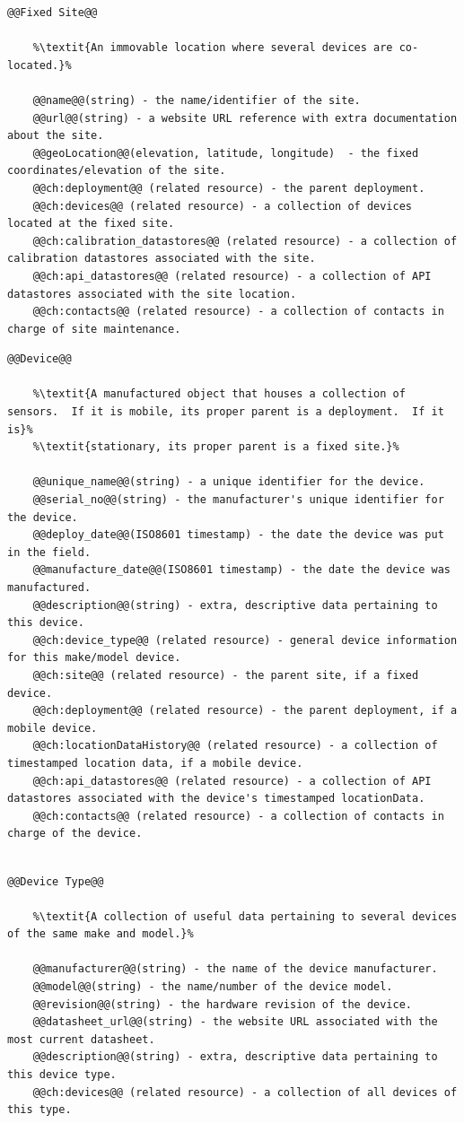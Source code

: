 \begin{lstlisting}[style=codedef]
@@Fixed Site@@
	
	%\textit{An immovable location where several devices are co-located.}%

	@@name@@(string) - the name/identifier of the site.
	@@url@@(string) - a website URL reference with extra documentation about the site.
	@@geoLocation@@(elevation, latitude, longitude)  - the fixed coordinates/elevation of the site.
	@@ch:deployment@@ (related resource) - the parent deployment.
	@@ch:devices@@ (related resource) - a collection of devices located at the fixed site.
	@@ch:calibration_datastores@@ (related resource) - a collection of calibration datastores associated with the site.
	@@ch:api_datastores@@ (related resource) - a collection of API datastores associated with the site location.	
	@@ch:contacts@@ (related resource) - a collection of contacts in charge of site maintenance.

\end{lstlisting}

\begin{lstlisting}[style=codedef]
@@Device@@
	
	%\textit{A manufactured object that houses a collection of sensors.  If it is mobile, its proper parent is a deployment.  If it is}%
	%\textit{stationary, its proper parent is a fixed site.}%

	@@unique_name@@(string) - a unique identifier for the device.
	@@serial_no@@(string) - the manufacturer's unique identifier for the device.
	@@deploy_date@@(ISO8601 timestamp) - the date the device was put in the field.	
	@@manufacture_date@@(ISO8601 timestamp) - the date the device was manufactured.
	@@description@@(string) - extra, descriptive data pertaining to this device.
	@@ch:device_type@@ (related resource) - general device information for this make/model device.
	@@ch:site@@ (related resource) - the parent site, if a fixed device.
	@@ch:deployment@@ (related resource) - the parent deployment, if a mobile device.
	@@ch:locationDataHistory@@ (related resource) - a collection of timestamped location data, if a mobile device.
	@@ch:api_datastores@@ (related resource) - a collection of API datastores associated with the device's timestamped locationData.
	@@ch:contacts@@ (related resource) - a collection of contacts in charge of the device.
	
\end{lstlisting}

\begin{lstlisting}[style=codedef]
@@Device Type@@
	
	%\textit{A collection of useful data pertaining to several devices of the same make and model.}%

	@@manufacturer@@(string) - the name of the device manufacturer.
	@@model@@(string) - the name/number of the device model.
	@@revision@@(string) - the hardware revision of the device.
	@@datasheet_url@@(string) - the website URL associated with the most current datasheet.
	@@description@@(string) - extra, descriptive data pertaining to this device type.
	@@ch:devices@@ (related resource) - a collection of all devices of this type.

\end{lstlisting}

